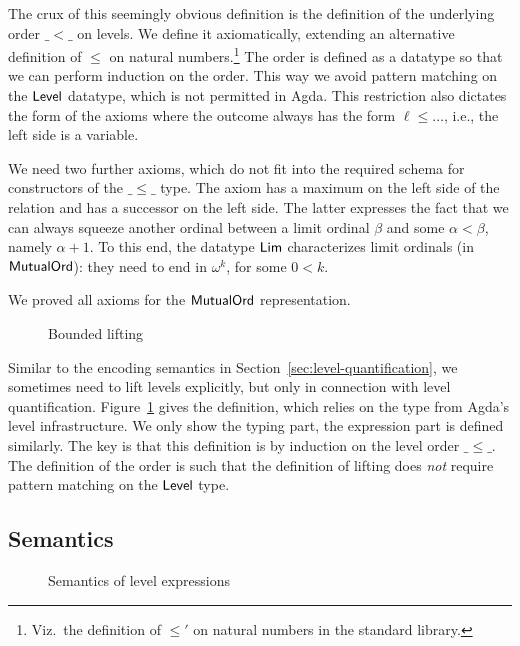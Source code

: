 \documentclass[manuscript,screen,review,anonymous]{acmart}
\begin{document}
{\BQBoundedLevel

The crux of this seemingly obvious definition is the definition of the
underlying order $\_<\_$ on levels. We define it axiomatically,
extending an alternative definition of $\le$ on natural
numbers.\footnote{Viz.\ the definition of $\le'$ on natural numbers in
  the standard library.} The order is defined as a datatype so that we
can perform induction on the order. This way we avoid pattern matching
on the $\ALevel$ datatype, which is not permitted in Agda. This
restriction also dictates the form of the axioms where the outcome
always has the form $\ell \le \dots$, i.e., the left side is a variable.

\begin{minipage}{0.45\linewidth}
  \BQLevelLe
  \BQLevelLt
\end{minipage}
\begin{minipage}{0.45\linewidth}
  \BQLim
  \BQAxiomsLe
\end{minipage}

We need two further axioms, which do not fit into the required schema
for constructors of the $\_\le\_$ type. The axiom {\ALeLubLub} has a maximum on
the left side of the relation and {\ALtSucLim} has a successor on the
left side. The latter expresses the fact that we can always squeeze
another ordinal between a limit ordinal $\beta$ and some
$\alpha<\beta$, namely $\alpha+1$. To this end, the datatype $\ALim$
characterizes limit ordinals (in $\AMutualOrd$): they need to end in
$\omega^k$, for some $0<k$.

We proved all axioms for the $\AMutualOrd$ representation.

\begin{figure}[tp]
  \BQBoundedLift
  \caption{Bounded lifting}
  \label{fig:eh-bounded-lifting}
\end{figure}
Similar to the encoding semantics in
Section~\ref{sec:level-quantification}, we sometimes need to lift
levels explicitly, but only in connection with level
quantification. Figure~\ref{fig:eh-bounded-lifting} gives the
definition, which relies on the {\ALift} type from Agda's level
infrastructure. We only show the typing part, the expression part is
defined similarly. The key is that this definition is by induction on
the level order $\_\le\_$. The definition of the order is such that
the definition of lifting does \emph{not} require pattern matching on
the $\ALevel$ type.

\subsection{Semantics}
\label{sec:semantics-1}
\begin{figure}[tp]
  \begin{minipage}[t]{0.45\linewidth}
    \EHLSemFin
  \end{minipage}
  \begin{minipage}[t]{0.45\linewidth}
    \EHLSemAny
  \end{minipage}
  \caption{Semantics of level expressions}
  \label{fig:eh-semantics-level-expressions}
\end{figure}

}
\end{document}
